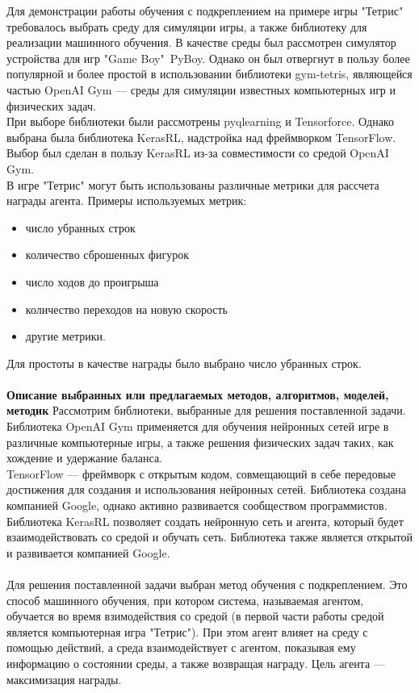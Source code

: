 \documentclass[draft]{article}
\begin{document}
Для демонстрации работы обучения с подкреплением на примере игры "Тетрис" требовалось выбрать среду для симуляции игры, а также библиотеку для реализации машинного обучения. 
В качестве среды был рассмотрен симулятор устройства для игр "Game Boy"\ PyBoy\cite{litlink11}. Однако он был отвергнут в пользу более популярной и более простой в использовании библиотеки gym-tetris\cite{litlink12}, являющейся частью OpenAI Gym\cite{litlink13} — среды для симуляции известных компьютерных игр и физических задач.\\
При выборе библиотеки были рассмотрены pyqlearning\cite{litlink14} и Tensorforce\cite{litlink15}. Однако выбрана была библиотека KerasRL\cite{litlink16}, надстройка над фреймворком TensorFlow\cite{litlink17}. Выбор был сделан в пользу KerasRL из-за совместимости со средой OpenAI Gym.\\
В игре "Тетрис" могут быть использованы различные метрики для рассчета награды агента. Примеры используемых метрик:
\begin{itemize}
\item число убранных строк
\item количество сброшенных фигурок
\item число ходов до проигрыша
\item количество переходов на новую скорость
\item другие метрики.
\end{itemize}
Для простоты в качестве награды было выбрано число убранных строк.\\~\\
\textbf{Описание выбранных или предлагаемых методов, алгоритмов, моделей, методик}
Рассмотрим библиотеки, выбранные для решения поставленной задачи. Библиотека OpenAI Gym применяется для обучения нейронных сетей игре в различные компьютерные игры, а также решения физических задач таких, как хождение и удержание баланса. \\
TensorFlow — фреймворк с открытым кодом, совмещающий в себе передовые достижения для создания и использования нейронных сетей. Библиотека создана компанией Google, однако активно развивается сообществом программистов\cite{litlink18}.\\
Библиотека KerasRL позволяет создать нейронную сеть и агента, который будет взаимодействовать со средой и обучать сеть. Библиотека также является открытой и развивается компанией Google.\\~\\
Для решения поставленной задачи выбран метод обучения с подкреплением. Это способ машинного обучения, при котором система, называемая агентом, обучается во время взимодействия со средой (в первой части работы средой является компьютерная игра "Тетрис"). При этом агент влияет на среду с помощью действий, а среда взаимодействует с агентом, показывая ему информацию о состоянии среды, а также возвращая награду. Цель агента — максимизация награды.\\
\end{document}
